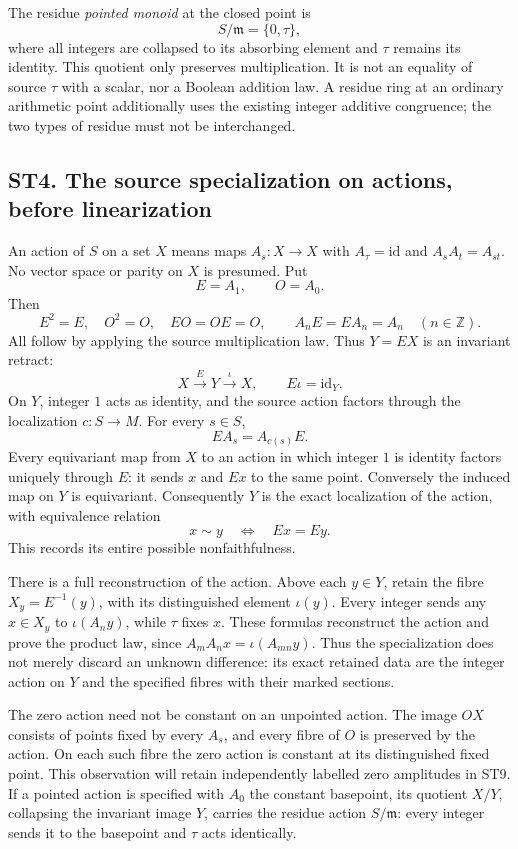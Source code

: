 The residue \emph{pointed monoid} at the closed point is \[
 S/\mathfrak m=\{0,\tau\},
\tag{ST3.6}
\] where all integers are collapsed to its absorbing element and
\(\tau\) remains its identity. This quotient only preserves
multiplication. It is not an equality of source \(\tau\) with a scalar,
nor a Boolean addition law. A residue ring at an ordinary arithmetic
point additionally uses the existing integer additive congruence; the
two types of residue must not be interchanged.

\subsection{ST4. The source specialization on actions, before
linearization}\label{st4.-the-source-specialization-on-actions-before-linearization}

An action of \(S\) on a set \(X\) means maps \(A_s:X\to X\) with
\(A_\tau=\mathrm{id}\) and \(A_sA_t=A_{st}\). No vector space or parity
on \(X\) is presumed. Put \[
 E=A_1,\qquad O=A_0.
\] Then \[
 E^2=E,\quad O^2=O,\quad EO=OE=O,\qquad
 A_nE=EA_n=A_n\quad(n\in\mathbb Z).
\tag{ST4.1}
\] All follow by applying the source multiplication law. Thus \(Y=EX\)
is an invariant retract: \[
 X\xrightarrow{E}Y\xrightarrow{\iota}X,\qquad
 E\iota=\mathrm{id}_Y.
\tag{ST4.2}
\] On \(Y\), integer \(1\) acts as identity, and the source action
factors through the localization \(c:S\to M\). For every \(s\in S\), \[
 E A_s=A_{c(s)}E.
\tag{ST4.3}
\] Every equivariant map from \(X\) to an action in which integer \(1\)
is identity factors uniquely through \(E\): it sends \(x\) and \(Ex\) to
the same point. Conversely the induced map on \(Y\) is equivariant.
Consequently \(Y\) is the exact localization of the action, with
equivalence relation \[
 x\sim y\quad\Longleftrightarrow\quad Ex=Ey.
\tag{ST4.4}
\] This records its entire possible nonfaithfulness.

There is a full reconstruction of the action. Above each \(y\in Y\),
retain the fibre \(X_y=E^{-1}(y)\), with its distinguished element
\(\iota(y)\). Every integer sends any \(x\in X_y\) to \(\iota(A_n y)\),
while \(\tau\) fixes \(x\). These formulas reconstruct the action and
prove the product law, since \(A_mA_nx=\iota(A_{mn}y)\). Thus the
specialization does not merely discard an unknown difference: its exact
retained data are the integer action on \(Y\) and the specified fibres
with their marked sections.

The zero action need not be constant on an unpointed action. The image
\(OX\) consists of points fixed by every \(A_s\), and every fibre of
\(O\) is preserved by the action. On each such fibre the zero action is
constant at its distinguished fixed point. This observation will retain
independently labelled zero amplitudes in ST9. If a pointed action is
specified with \(A_0\) the constant basepoint, its quotient \(X/Y\),
collapsing the invariant image \(Y\), carries the residue action
\(S/\mathfrak m\): every integer sends it to the basepoint and \(\tau\)
acts identically.

